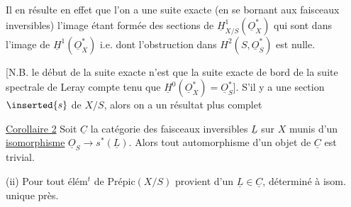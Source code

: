 Il en résulte en effet que l'on a une suite exacte (en se bornant aux faisceaux inversibles)
l'image  étant formée des sections de $\underline H^1_{X/S}(\underline O_X^*)$ qui sont dans l'image de $\underline H^1(\underline O_X^*)$ i.e. dont l'obstruction dans $H^2(S,\underline O_S^*)$ est nulle.

[N.B. le début de la suite exacte n'est que la suite exacte de bord de la suite spectrale de Leray
compte tenu que $\underline H^0(\underline O_X^*)=\underline O_S^*$]. S'il y a une section $\inserted{s}$ de $X/S$, alors on  a un résultat plus complet

\uline{Corollaire 2} Soit $\underline C$ la catégorie des faisceaux inversibles $\underline L$ sur $X$ munis d'un \uline{isomorphisme} $\underline O_S\to s^*(\underline L)$. Alors  tout automorphisme d'un objet de $\underline C$ est trivial.

(ii) Pour  tout élém$^t$ de $\mathrm{Prépic}(X/S)$ provient d'un $\underline L\in\underline C$, déterminé à isom. unique près.

